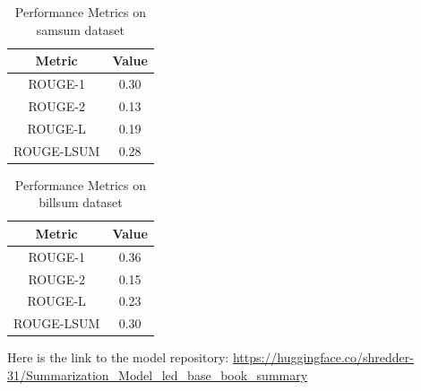 \begin{table}[h!]
    \centering
    \begin{tabular}{|c|c|}
        \hline
        \textbf{Metric} & \textbf{Value} \\
        \hline
        ROUGE-1 & 0.30 \\
        \hline
        ROUGE-2 & 0.13 \\
        \hline
        ROUGE-L & 0.19 \\
        \hline
        ROUGE-LSUM & 0.28 \\
        \hline
    \end{tabular}
    \caption{Performance Metrics on samsum dataset}
    \label{tab:performance_metrics}
\end{table}


\begin{table}[h!]
    \centering
    \begin{tabular}{|c|c|}
        \hline
        \textbf{Metric} & \textbf{Value} \\
        \hline
        ROUGE-1 & 0.36 \\
        \hline
        ROUGE-2 & 0.15 \\
        \hline
        ROUGE-L & 0.23 \\
        \hline
        ROUGE-LSUM & 0.30 \\
        \hline
    \end{tabular}
    \caption{Performance Metrics on billsum dataset}
    \label{tab:performance_metrics}
\end{table}

\hfill \break
Here is the link to the model repository: \url{https://huggingface.co/shredder-31/Summarization_Model_led_base_book_summary}